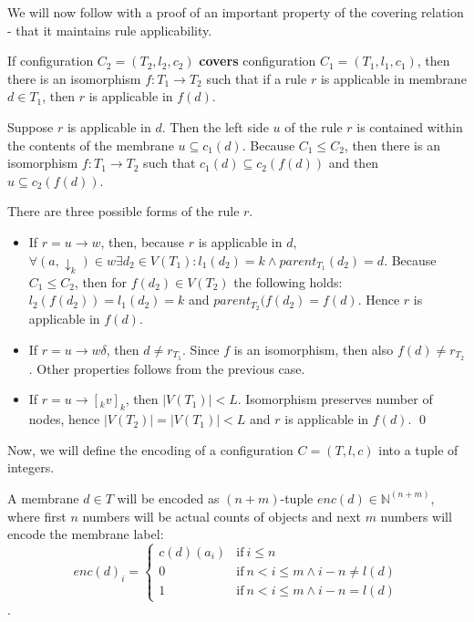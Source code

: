 We will now follow with a proof of an important property of the covering relation - that it maintains rule applicability.

\begin{lemma}
\label{rule_applicability_lemma}
  If configuration $C_2 = (T_2, l_2, c_2)$ {\bf covers} configuration $C_1 = (T_1, l_1, c_1)$, then there is an  isomorphism $f: T_1\rightarrow T_2$ such that if a rule $r$ is applicable in membrane $d\in T_1$, then $r$ is applicable in $f(d)$.
\end{lemma}

\begin{dokaz}
  Suppose $r$ is applicable in $d$. Then the left side $u$ of the rule $r$ is contained within the contents of the membrane $u\subseteq c_1(d)$. Because $C_1\leq C_2$, then there is an isomorphism $f:T_1\rightarrow T_2$ such that $c_1(d)\subseteq c_2(f(d))$ and then $u\subseteq c_2(f(d))$.

  There are three possible forms of the rule $r$.
  \begin{itemize}
    \item If $r = u\rightarrow w$, then, because $r$ is applicable in $d$, $\forall (a,\downarrow_k)\in w \exists d_2\in V(T_1): l_1(d_2)=k \wedge parent_{T_1}(d_2) = d$. Because $C_1\leq C_2$, then for $f(d_2)\in V(T_2)$ the following holds: $l_2(f(d_2)) = l_1(d_2) = k$ and $parent_{T_2}(f(d_2) = f(d)$. Hence $r$ is applicable in $f(d)$.
    \item If $r = u\rightarrow w\delta$, then $d\neq r_{T_1}$. Since $f$ is an isomorphism, then also $f(d)\neq r_{T_2}$. Other properties follows from the previous case.
    \item If $r = u\rightarrow [_k v]_k$, then $|V(T_1)|<L$. Isomorphism preserves number of nodes, hence $|V(T_2)| = |V(T_1)| < L$ and $r$ is applicable in $f(d)$. \qed
  \end{itemize}
\end{dokaz}

Now, we will define the encoding of a configuration $C = (T, l, c)$ into a tuple of integers.

A membrane $d\in T$ will be encoded as $(n+m)$-tuple $enc(d)\in\mathbb N^{(n+m)}$, where first $n$ numbers will be actual counts of objects and next $m$ numbers will encode the membrane label:
\[
  enc(d)_{i} =
  \begin{cases}
    c(d)(a_i) & \text{if}\ i\leq n\\
    0 & \text{if}\ n<i\leq m\wedge i-n\neq l(d)\\
    1 & \text{if}\ n<i\leq m\wedge i-n=l(d)
  \end{cases}
\].

